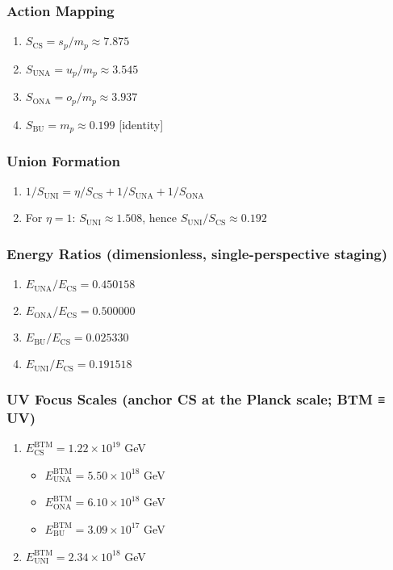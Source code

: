 \documentclass[11pt,a4paper]{article}
\theoremstyle{definition}
\theoremstyle{remark}
\begin{document}
\subsubsection{Action Mapping}
\begin{enumerate}
\item $S_{\mathrm{CS}} = s_p / m_p \approx 7.875$
\item $S_{\mathrm{UNA}} = u_p / m_p \approx 3.545$
\item $S_{\mathrm{ONA}} = o_p / m_p \approx 3.937$
\item $S_{\mathrm{BU}} = m_p \approx 0.199$ [identity]
\end{enumerate}

\subsubsection{Union Formation}
\begin{enumerate}
\item $1/S_{\mathrm{UNI}} = \eta/S_{\mathrm{CS}} + 1/S_{\mathrm{UNA}} + 1/S_{\mathrm{ONA}}$
\item For $\eta = 1$: $S_{\mathrm{UNI}} \approx 1.508$, hence $S_{\mathrm{UNI}}/S_{\mathrm{CS}} \approx 0.192$
\end{enumerate}

\subsubsection{Energy Ratios (dimensionless, single-perspective staging)}
\begin{enumerate}
\item $E_{\mathrm{UNA}}/E_{\mathrm{CS}} = 0.450158$
\item $E_{\mathrm{ONA}}/E_{\mathrm{CS}} = 0.500000$
\item $E_{\mathrm{BU}}/E_{\mathrm{CS}} = 0.025330$
\item $E_{\mathrm{UNI}}/E_{\mathrm{CS}} = 0.191518$
\end{enumerate}

\subsubsection{UV Focus Scales (anchor CS at the Planck scale; BTM ≡ UV)}
\begin{enumerate}
\item $E_{\mathrm{CS}}^{\mathrm{BTM}} = 1.22 \times 10^{19}$ GeV
\begin{itemize}
\item $E_{\mathrm{UNA}}^{\mathrm{BTM}} = 5.50 \times 10^{18}$ GeV
\item $E_{\mathrm{ONA}}^{\mathrm{BTM}} = 6.10 \times 10^{18}$ GeV
\item $E_{\mathrm{BU}}^{\mathrm{BTM}} = 3.09 \times 10^{17}$ GeV
\end{itemize}
\item $E_{\mathrm{UNI}}^{\mathrm{BTM}} = 2.34 \times 10^{18}$ GeV
\end{enumerate}
\end{document}
